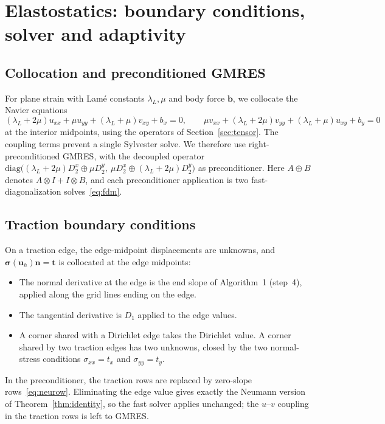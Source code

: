 \documentclass[preprint,12pt]{elsarticle}
\theoremstyle{remark}
\begin{document}
\section{Elastostatics: boundary conditions, solver and adaptivity}\label{sec:elast}
\subsection{Collocation and preconditioned GMRES}
For plane strain with Lam\'e constants $\lambda_L,\mu$ and body force $\mathbf b$, we collocate the
Navier equations
\begin{equation}
(\lambda_L+2\mu)u_{xx}+\mu u_{yy}+(\lambda_L+\mu)v_{xy}+b_x=0,\qquad
\mu v_{xx}+(\lambda_L+2\mu)v_{yy}+(\lambda_L+\mu)u_{xy}+b_y=0
\end{equation}
at the interior midpoints, using the operators of Section~\ref{sec:tensor}. The coupling terms
prevent a single Sylvester solve. We therefore use right-preconditioned GMRES, with the decoupled
operator
$\mathrm{diag}\big((\lambda_L+2\mu)D_2^x\oplus\mu D_2^y,\ \mu D_2^x\oplus(\lambda_L+2\mu)D_2^y\big)$
as preconditioner. Here $A\oplus B$ denotes $A\otimes I+I\otimes B$, and each preconditioner
application is two fast-diagonalization solves~\eqref{eq:fdm}.

\subsection{Traction boundary conditions}\label{sec:traction}
On a traction edge, the edge-midpoint displacements are unknowns, and
$\boldsymbol\sigma(\mathbf u_h)\mathbf n=\mathbf t$ is collocated at the edge midpoints:
\begin{itemize}
\item The normal derivative at the edge is the end slope of Algorithm~1 (step~4), applied along the
grid lines ending on the edge.
\item The tangential derivative is $D_1$ applied to the edge values.
\item A corner shared with a Dirichlet edge takes the Dirichlet value. A corner shared by two traction
edges has two unknowns, closed by the two normal-stress conditions $\sigma_{xx}=t_x$ and
$\sigma_{yy}=t_y$.
\end{itemize}
In the preconditioner, the traction rows are replaced by zero-slope rows~\eqref{eq:neurow}. Eliminating
the edge value gives exactly the Neumann version of Theorem~\ref{thm:identity}, so the fast solver
applies unchanged; the $u$--$v$ coupling in the traction rows is left to GMRES.
\end{document}
